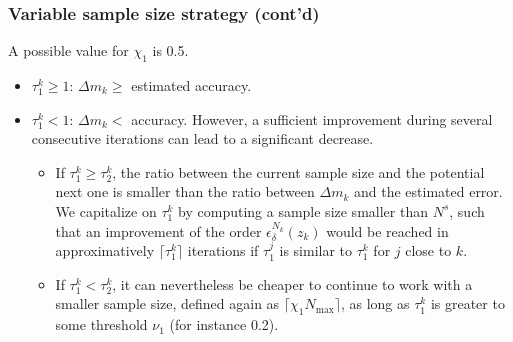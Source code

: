 \documentclass{beamer}
\begin{document}
\begin{frame}
\frametitle{Variable sample size strategy (cont'd)}

A possible value for $\chi_1$ is 0.5.

\begin{itemize}
	\item 
$\tau_1^k \geq 1$: $\Delta m_k \geq$ estimated accuracy.
\item
$\tau_1^k < 1$: $\Delta m_k <$ accuracy.
However, %
a sufficient improvement during several consecutive iterations can lead to a significant decrease.%
\begin{itemize}
\item 
If $\tau_1^k \geq \tau_2^k$, the ratio between the current sample size and the potential next one is smaller than the ratio between $\Delta m_k$ and the estimated error.
We capitalize on $\tau_1^k$ by computing a sample size smaller than  $N^s$, such that an improvement of the order $\epsilon_\delta^{N_k}(z_k)$ would be reached in approximatively $\lceil \tau_1^k \rceil$ iterations if $\tau_1^j$ is similar to $\tau_1^k$ for $j$ close to $k$.
\item
If $\tau_1^k < \tau_2^k$, it can nevertheless be cheaper to continue to work with a smaller sample size, defined again as $\lceil \chi_1 N_{\max} \rceil$, as long as $\tau_1^k$ is greater to some threshold $\nu_1$ (for instance 0.2).
\end{itemize}
\end{itemize}

\end{frame}
\end{document}
